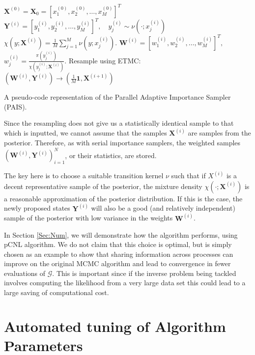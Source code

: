 \documentclass[final]{siamltex}
\newcommand{\G}{\mathcal{G}}
\newcommand{\X}{{\mathbf X}}
\newcommand{\Y}{{\mathbf Y}}
\newcommand{\W}{{\mathbf W}}
\begin{document}
\begin{table}
\begin{mdframed}
\begin{algorithmic}
\STATE $\X^{(0)} = \X_0 = [x_1^{(0)},x_2^{(0)},\ldots,x_M^{(0)}]^T$
\STATE $\Y^{(i)} = [y_1^{(i)},y_2^{(i)},\ldots,y_M^{(i)}]^T, \quad y_j^{(i)} \sim
\nu(\cdot;x_j^{(i)})$
\STATE $\chi(y;\X^{(i)}) = \frac{1}{M}
\sum_{j=1}^M \nu(y;x_j^{(i)})$.
\STATE $\W^{(i)} = [w_1^{(i)},w_2^{(i)},\ldots,w_M^{(i)}]^T,$ \quad $w^{(i)}_j =
\frac{\pi(y_j^{(i)})}{\chi(y_j^{(i)};\X^{(i)})}$.
\STATE Resample using ETMC: $(\W^{(i)},\Y^{(i)}) \rightarrow (\frac{1}{M}\mathbf{1}, \X^{(i+1)})$
\ENDFOR 
\end{algorithmic}
\end{mdframed}

\caption{A pseudo-code representation of the Parallel Adaptive
  Importance Sampler (PAIS).}
\label{tab:PAIS}
\end{table}

Since the resampling does not give us a statistically identical sample
to that which is inputted, we cannot assume that the samples $\X^{(i)}$
are samples from the posterior. Therefore, as with serial
importance samplers, the weighted samples
$(\W^{(i)},\Y^{(i)})_{i=1}^N$, or their statistics, are stored.

The key here is to choose a suitable transition kernel $\nu$ such that
if $X^{(i)}$ is a decent representative sample of the posterior,
the mixture density $\chi(\cdot;\X^{(i)})$ is a reasonable
approximation of the posterior distribution. If this is the case,
the newly proposed states $\Y^{(i)}$ will also be a good (and relatively
independent) sample of the posterior with low variance in the
weights $\W^{(i)}$.

In Section \ref{Sec:Num}, we will demonstrate how the algorithm
performs, using pCNL algorithm. We do not claim that this choice is optimal, but
is simply chosen as an example to show that sharing information across
processes can improve on the original MCMC algorithm and lead to
convergence in fewer evaluations of $\G$. This is important since if
the inverse problem being tackled involves computing
the likelihood from a very large data set this could lead to a
large saving of computational cost.

\section{Automated tuning of Algorithm Parameters}\label{Sec:adapt}
\end{document}
